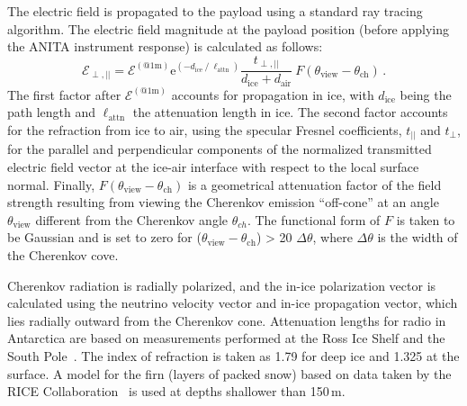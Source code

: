 
The electric field is propagated to the payload using a standard ray tracing algorithm.
The electric field magnitude at the payload position (before applying
the ANITA instrument response) is calculated as follows:
\begin{equation}
 \mathcal{E}_{\perp,||} = \mathcal{E}^{(\mathrm{@ 1m})}  
 \mathrm{e}^{(-d_{\mathrm{ice}}\ /\ \ell_{\mathrm{attn}})}
 \frac{t_{\perp,||}}{d_{\mathrm{ice}} + d_{\mathrm{air}}}
 \ F(\theta_{\mathrm{view}}-\theta_{\mathrm{ch}}) \,.
\end{equation}
The first factor after $\mathcal{E}^{(\mathrm{@ 1m})}$ accounts for propagation in ice, with $d_{\mathrm{ice}}$ being the path length and $\ell_{\mathrm{attn}}$ the attenuation length in ice. 
The second factor accounts for the refraction from ice to air, using
the specular Fresnel coefficients, $t_{||}$ and $t_{\perp}$, for the parallel and perpendicular components of the normalized transmitted electric field vector at the ice-air interface with respect to the local surface normal.
Finally, $F(\theta_{\mathrm{view}}-\theta_{\mathrm{ch}})$ is a geometrical attenuation factor of the field strength resulting from viewing the Cherenkov emission ``off-cone'' at an angle $\theta_{\mathrm{view}}$ different from the Cherenkov angle $\theta_{ch}$.
The functional form of $F$ is taken to be Gaussian and is set to zero for ($\theta_{\mathrm{view}}-\theta_{\mathrm{ch}}$) > 20 $\Delta \theta$, where $\Delta \theta$ is the width of the Cherenkov cove. 


Cherenkov radiation is radially polarized, and the in-ice polarization vector is calculated using the neutrino velocity vector and in-ice propagation vector, which lies radially outward from the Cherenkov cone.
Attenuation lengths for radio in Antarctica are based on measurements performed at the Ross Ice Shelf and the South Pole~\cite{smex}.
The index of refraction is taken as 1.79 for deep ice and 1.325 at the surface. A model for the firn (layers of packed snow) based on data taken by the RICE Collaboration~\cite{PhysRevD.73.082002} is used at depths shallower than 150\,m.

